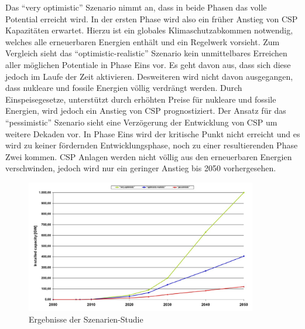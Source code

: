 Das "`very optimistic"' Szenario nimmt an, dass in beide Phasen das volle Potential erreicht wird. In der ersten Phase wird also ein früher Anstieg von CSP Kapazitäten erwartet. Hierzu ist ein globales Klimaschutzabkommen notwendig, welches alle erneuerbaren Energien enthält und ein Regelwerk vorsieht.
Zum Vergleich sieht das "`optimistic-realistic"' Szenario kein unmittelbares Erreichen aller möglichen Potentiale in Phase Eins vor. Es geht davon aus, dass sich diese jedoch im Laufe der Zeit aktivieren. Desweiteren wird nicht davon ausgegangen, dass nukleare und fossile Energien völlig verdrängt werden. Durch Einspeisegesetze, unterstützt durch erhöhten Preise für nukleare und fossile Energien, wird jedoch ein Anstieg von CSP prognostiziert.
Der Ansatz für das "`pessimistic"' Szenario sieht eine Verzögerung der Entwicklung von CSP um weitere Dekaden vor. In Phase Eins wird der kritische Punkt nicht erreicht und es wird zu keiner fördernden Entwicklungsphase, noch zu einer resultierenden Phase Zwei kommen. CSP Anlagen werden nicht völlig aus den erneuerbaren Energien verschwinden, jedoch wird nur ein geringer Anstieg bis 2050 vorhergesehen.


\begin{figure}[H]
	\centering
	\includegraphics[width=0.9\textwidth,trim=1 1 1 1,clip]{szenarien.png}
	\caption{Ergebnisse der Szenarien-Studie}
	\label{fig:scenes}
\end{figure}


